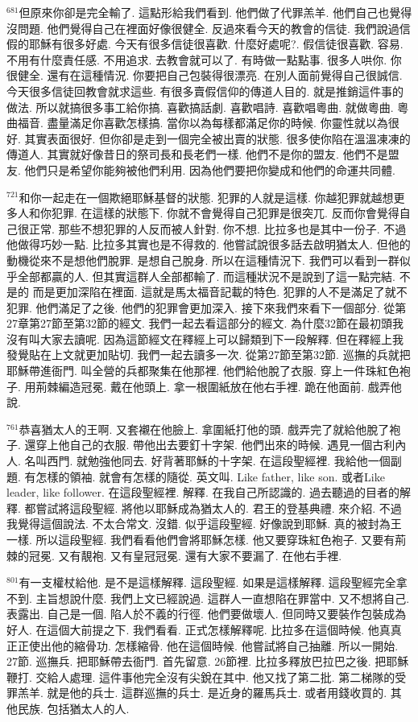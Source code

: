 \documentclass{book}
\begin{document}
$^{681}$但原來你卻是完全輸了.
這點形給我們看到.
他們做了代罪羔羊.
他們自己也覺得沒問題.
他們覺得自己在裡面好像很健全.
反過來看今天的教會的信徒.
我們說過信假的耶穌有很多好處.
今天有很多信徒很喜歡.
什麼好處呢?.
假信徒很喜歡.
容易.
不用有什麼責任感.
不用追求.
去教會就可以了.
有時做一點點事.
很多人哄你.
你很健全.
還有在這種情況.
你要把自己包裝得很漂亮.
在別人面前覺得自己很誠信.
今天很多信徒回教會就求這些.
有很多賣假信仰的傳道人目的.
就是推銷這件事的做法.
所以就搞很多事工給你搞.
喜歡搞話劇.
喜歡唱詩.
喜歡唱粵曲.
就做粵曲.
粵曲福音.
盡量滿足你喜歡怎樣搞.
當你以為每樣都滿足你的時候.
你靈性就以為很好.
其實表面很好.
但你卻是走到一個完全被出賣的狀態.
很多使你陷在溫溫凍凍的傳道人.
其實就好像昔日的祭司長和長老們一樣.
他們不是你的盟友.
他們不是盟友.
他們只是希望你能夠被他們利用.
因為他們要把你變成和他們的命運共同體.

$^{721}$和你一起走在一個欺絕耶穌基督的狀態.
犯罪的人就是這樣.
你越犯罪就越想更多人和你犯罪.
在這樣的狀態下.
你就不會覺得自己犯罪是很突兀.
反而你會覺得自己很正常.
那些不想犯罪的人反而被人針對.
你不想.
比拉多也是其中一份子.
不過他做得巧妙一點.
比拉多其實也是不得救的.
他嘗試說很多話去啟明猶太人.
但他的動機從來不是想他們脫罪.
是想自己脫身.
所以在這種情況下.
我們可以看到一群似乎全部都贏的人.
但其實這群人全部都輸了.
而這種狀況不是說到了這一點完結.
不是的 而是更加深陷在裡面.
這就是馬太福音記載的特色.
犯罪的人不是滿足了就不犯罪.
他們滿足了之後.
他們的犯罪會更加深入.
接下來我們來看下一個部分.
從第27章第27節至第32節的經文.
我們一起去看這部分的經文.
為什麼32節在最初頭我沒有叫大家去讀呢.
因為這節經文在釋經上可以歸類到下一段解釋.
但在釋經上我發覺貼在上文就更加貼切.
我們一起去讀多一次.
從第27節至第32節.
巡撫的兵就把耶穌帶進衙門.
叫全營的兵都聚集在他那裡.
他們給他脫了衣服.
穿上一件珠紅色袍子.
用荊棘編造冠冕.
戴在他頭上.
拿一根圍紙放在他右手裡.
跪在他面前.
戲弄他說.

$^{761}$恭喜猶太人的王啊.
又套襯在他臉上.
拿圍紙打他的頭.
戲弄完了就給他脫了袍子.
還穿上他自己的衣服.
帶他出去要釘十字架.
他們出來的時候.
遇見一個古利內人.
名叫西門.
就勉強他同去.
好背著耶穌的十字架.
在這段聖經裡.
我給他一個副題.
有怎樣的領袖.
就會有怎樣的隨從.
英文叫.
Like father, like son.
或者Like leader, like follower.
在這段聖經裡.
解釋.
在我自己所認識的.
過去聽過的目者的解釋.
都嘗試將這段聖經.
將他以耶穌成為猶太人的.
君王的登基典禮.
來介紹.
不過我覺得這個說法.
不太合常文.
沒錯.
似乎這段聖經.
好像說到耶穌.
真的被封為王一樣.
所以這段聖經.
我們看看他們會將耶穌怎樣.
他又要穿珠紅色袍子.
又要有荊棘的冠冕.
又有靚袍.
又有皇冠冠冕.
還有大家不要漏了.
在他右手裡.

$^{801}$有一支權杖給他.
是不是這樣解釋.
這段聖經.
如果是這樣解釋.
這段聖經完全拿不到.
主旨想說什麼.
我們上文已經說過.
這群人一直想陷在罪當中.
又不想將自己.
表露出.
自己是一個.
陷人於不義的行徑.
他們要做壞人.
但同時又要裝作包裝成為好人.
在這個大前提之下.
我們看看.
正式怎樣解釋呢.
比拉多在這個時候.
他真真正正使出他的縮骨功.
怎樣縮骨.
他在這個時候.
他嘗試將自己抽離.
所以一開始.
27節.
巡撫兵.
把耶穌帶去衙門.
首先留意.
26節裡.
比拉多釋放巴拉巴之後.
把耶穌鞭打.
交給人處理.
這件事他完全沒有尖銳在其中.
他又找了第二批.
第二梯隊的受罪羔羊.
就是他的兵士.
這群巡撫的兵士.
是近身的羅馬兵士.
或者用錢收買的.
其他民族.
包括猶太人的人.
\end{document}
